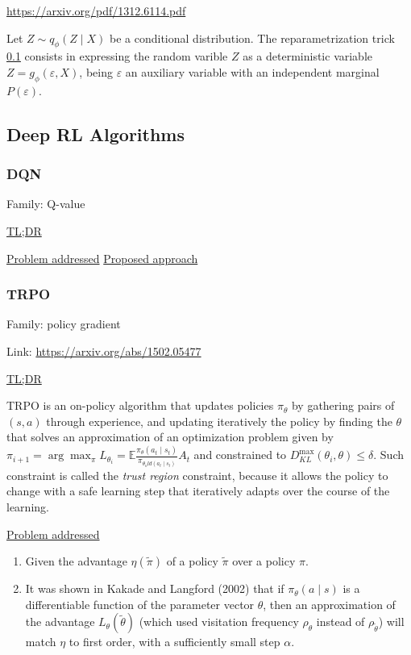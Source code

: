 \documentclass[12pt, english]{article}
\begin{document}
\url{https://arxiv.org/pdf/1312.6114.pdf}

Let $Z \sim q_\phi(Z \mid X)$ be a conditional distribution. The reparametrization trick \ref{} consists in expressing the random varible $Z$ as a deterministic variable $Z = g_\phi(\varepsilon, X)$, being $\varepsilon$ an auxiliary variable with an independent marginal $P(\varepsilon)$.


\subsection{Deep RL Algorithms}

\subsubsection{DQN}
\label{DQN}

Family: Q-value

\underline{TL;DR}


\underline{Problem addressed}
\underline{Proposed approach}



\subsubsection{TRPO}
\label{TRPO}

Family: policy gradient

Link: \url{https://arxiv.org/abs/1502.05477}

\underline{TL;DR}

TRPO \cite{schulman_trust_2015} is an on-policy algorithm that updates policies $\pi_\theta$ by gathering pairs of $(s,a)$ through experience, and updating iteratively the policy by finding the $\theta$ that solves an approximation of an optimization problem given by $\pi_{i+1} = \arg\max_\pi L_{\theta_i} = \mathbb{E} \frac{\pi_\theta(a_t \mid s_t)}{\pi_{\theta_old (a_t \mid s_t)}} A_t$ and constrained to $D_{KL}^{\max}(\theta_i, \theta) \leq \delta$. Such constraint is called the \textit{trust region} constraint, because it allows the policy to change with a safe learning step that iteratively adapts over the course of the learning.

\underline{Problem addressed}

\begin{enumerate}
  \item Given the advantage $\eta(\tilde{\pi})$ of a policy $\tilde{\pi}$ over a policy $\pi$.
  \item It was shown in Kakade and Langford (2002) that if $\pi_\theta(a \mid s)$ is a differentiable function of the parameter vector $\theta$, then an approximation of the advantage $L_\theta(\tilde{\theta})$ (which used visitation frequency $\rho_\theta$ instead of $\rho_{\tilde{\theta}}$) will match $\eta$ to first order, with a sufficiently small step $\alpha$.
\end{enumerate}
\end{document}
